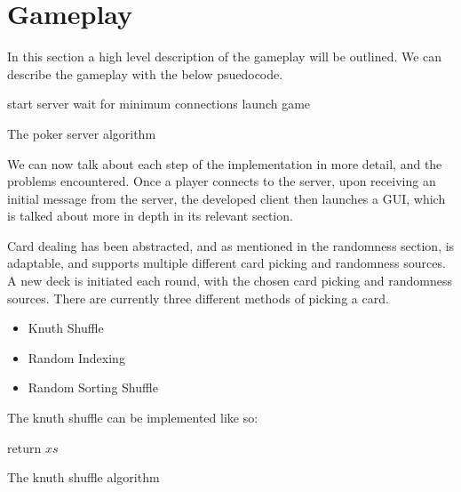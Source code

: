 \section{Gameplay}
In this section a high level description of the gameplay will be outlined.
We can describe the gameplay with the below psuedocode.

\vspace{0.3cm}

\begin{algorithm}[H]
    start server\;
    wait for minimum connections\;
    launch game\;
\caption{The poker server algorithm}%
\label{code:pokerServer}
\end{algorithm}

\vspace{0.3cm}

We can now talk about each step of the implementation in more detail, and the
problems encountered. Once a player connects to the server, upon receiving
an initial message from the server, the developed client then launches
a GUI, which is talked about more in depth in its relevant section.

Card dealing has been abstracted, and as mentioned in the randomness section,
is adaptable, and supports multiple different card picking and randomness
sources. A new deck is initiated each round, with the chosen card picking
and randomness sources. There are currently three different methods of
picking a card.

\begin{itemize}
    \item Knuth Shuffle
    \item Random Indexing
    \item Random Sorting Shuffle
\end{itemize}

The knuth shuffle \parencite{knuth1997} can be implemented like so:

\vspace{0.3cm}

\begin{algorithm}[H]
    \BlankLine{}
    return $xs$\;
\caption{The knuth shuffle algorithm}
\end{algorithm}


